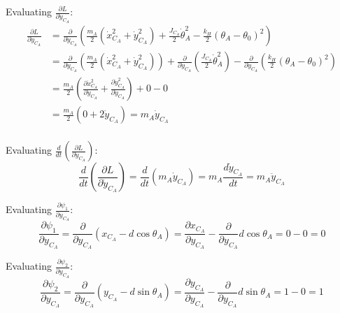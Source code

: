 \documentclass[titlepage]{article}
\begin{document}
Evaluating $\frac{\partial L}{\partial\dot{y}_{C_A}}$:
\begin{equation}
	\begin{split}
		\frac{\partial L}{\partial\dot{y}_{C_A}}&=\frac{\partial}{\partial\dot{y}_{C_A}}\left(\frac{m_A}{2}\left(\dot{x}_{C_A}^2+\dot{y}_{C_A}^2\right)+\frac{J_{C_A}}{2}\dot{\theta}_A^2-\frac{k_H}{2}(\theta_A-\theta_0)^2\right) \\
		&=\frac{\partial}{\partial\dot{y}_{C_A}}\left(\frac{m_A}{2}\left(\dot{x}_{C_A}^2+\dot{y}_{C_A}^2\right)\right)+\frac{\partial}{\partial\dot{y}_{C_A}}\left(\frac{J_{C_A}}{2}\dot{\theta}_A^2\right)-\frac{\partial}{\partial\dot{y}_{C_A}}\left(\frac{k_H}{2}(\theta_A-\theta_0)^2\right) \\
		&=\frac{m_A}{2}\left(\frac{\partial\dot{x}_{C_A}^2}{\partial\dot{y}_{C_A}}+\frac{\partial\dot{y}_{C_A}^2}{\partial\dot{y}_{C_A}}\right)+0-0 \\
		&=\frac{m_A}{2}\left(0+2\dot{y}_{C_A}\right)=m_A\dot{y}_{C_A} \\
	\end{split}
\end{equation}

Evaluating $\frac{d}{dt}\left(\frac{\partial L}{\partial\dot{y}_{C_A}}\right)$:
\begin{equation}
	\frac{d}{dt}\left(\frac{\partial L}{\partial\dot{y}_{C_A}}\right)=\frac{d}{dt}\left(m_A\dot{y}_{C_A}\right)=m_A\frac{d\dot{y}_{C_A}}{dt}=m_A\ddot{y}_{C_A}
\end{equation}

Evaluating $\frac{\partial\psi_1}{\partial y_{C_A}}$:
\begin{equation}
	\frac{\partial\psi_1}{\partial y_{C_A}}=\frac{\partial}{\partial y_{C_A}}\left(x_{C_A}-d\cos\theta_A\right)=\frac{\partial x_{C_A}}{\partial y_{C_A}}-\frac{\partial}{\partial y_{C_A}}d\cos\theta_A=0-0=0
\end{equation}

Evaluating $\frac{\partial\psi_2}{\partial y_{C_A}}$:
\begin{equation}
	\frac{\partial\psi_2}{\partial y_{C_A}}=\frac{\partial}{\partial y_{C_A}}\left(y_{C_A}-d\sin\theta_A\right)=\frac{\partial y_{C_A}}{\partial y_{C_A}}-\frac{\partial}{\partial y_{C_A}}d\sin\theta_A=1-0=1
\end{equation}
\end{document}
